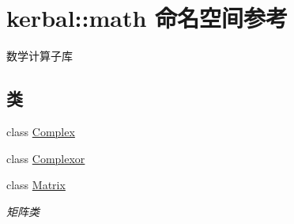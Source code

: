 \hypertarget{namespacekerbal_1_1math}{}\section{kerbal\+:\+:math 命名空间参考}
\label{namespacekerbal_1_1math}


数学计算子库  


\subsection*{类}
\begin{DoxyCompactItemize}
\item 
class \hyperlink{classkerbal_1_1math_1_1_complex}{Complex}
\item 
class \hyperlink{classkerbal_1_1math_1_1_complexor}{Complexor}
\item 
class \hyperlink{classkerbal_1_1math_1_1_matrix}{Matrix}
\begin{DoxyCompactList}\small\item\em 矩阵类 \end{DoxyCompactList}\end{DoxyCompactItemize}
